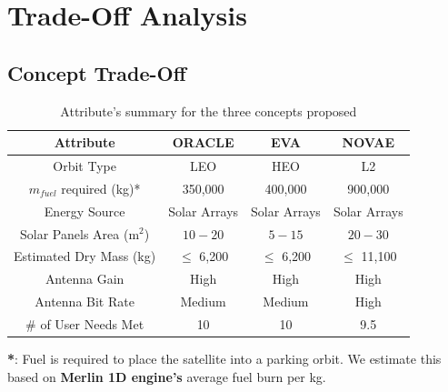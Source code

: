 \section{Trade-Off Analysis}
\subsection{Concept Trade-Off}
 
\begin{table}[H]
\centering
\begin{tabular}{|c|c|c|c|}
\hline
\textbf{Attribute} & \textbf{ORACLE} & \textbf{EVA} & \textbf{NOVAE} \\ \hline
 Orbit Type      &      LEO     &     HEO      &     L2      \\ \hline
 $m_{fuel}$ required (kg)*     &    350,000      &      400,000     &   900,000         \\ \hline
Energy Source       &      Solar Arrays    &      Solar Arrays     &    Solar Arrays       \\ \hline
 Solar Panels Area (m$^2$)      &    $10-20$       &    $5-15$       &    $20-30$       \\ \hline
   Estimated Dry Mass (kg)       &       $\leq$ 6,200    &   $\leq$ 6,200        &        $\leq$ 11,100   \\ \hline
    Antenna Gain      &       High    &    High       &      High     \\ \hline
    Antenna Bit Rate      &     Medium      &     Medium      &     High      \\ \hline
    \# of User Needs Met      &     10      &      10     &     9.5      \\ \hline
\end{tabular}
\caption{Attribute's summary for the three concepts proposed}
\end{table}
\textbf{*}: Fuel is required to place the satellite into a parking orbit. We estimate this based on \textbf{Merlin 1D engine's} average fuel burn per kg.

